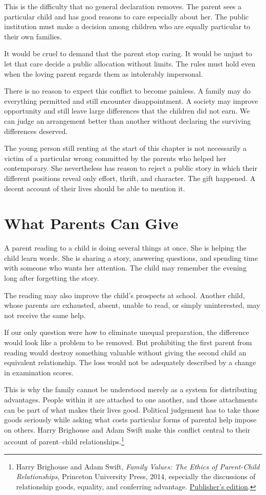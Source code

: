 \documentclass[12pt,a4paper]{book}
\begin{document}
This is the difficulty that no general declaration removes. The parent sees a particular child and has good reasons to care especially about her. The public institution must make a decision among children who are equally particular to their own families.

It would be cruel to demand that the parent stop caring. It would be unjust to let that care decide a public allocation without limits. The rules must hold even when the loving parent regards them as intolerably impersonal.

There is no reason to expect this conflict to become painless. A family may do everything permitted and still encounter disappointment. A society may improve opportunity and still leave large differences that the children did not earn. We can judge an arrangement better than another without declaring the surviving differences deserved.

The young person still renting at the start of this chapter is not necessarily a victim of a particular wrong committed by the parents who helped her contemporary. She nevertheless has reason to reject a public story in which their different positions reveal only effort, thrift, and character. The gift happened. A decent account of their lives should be able to mention it.

\chapter{What Parents Can Give}

A parent reading to a child is doing several things at once. She is helping the child learn words. She is sharing a story, answering questions, and spending time with someone who wants her attention. The child may remember the evening long after forgetting the story.

The reading may also improve the child's prospects at school. Another child, whose parents are exhausted, absent, unable to read, or simply uninterested, may not receive the same help.

If our only question were how to eliminate unequal preparation, the difference would look like a problem to be removed. But prohibiting the first parent from reading would destroy something valuable without giving the second child an equivalent relationship. The loss would not be adequately described by a change in examination scores.

This is why the family cannot be understood merely as a system for distributing advantages. People within it are attached to one another, and those attachments can be part of what makes their lives good. Political judgement has to take those goods seriously while asking what costs particular forms of parental help impose on others. Harry Brighouse and Adam Swift make this conflict central to their account of parent--child relationships.\footnote{Harry Brighouse and Adam Swift, \emph{Family Values: The Ethics of Parent-Child Relationships}, Princeton University Press, 2014, especially the discussions of relationship goods, equality, and conferring advantage. \href{https://academic.oup.com/princeton-scholarship-online/book/23923}{Publisher's edition}.}
\end{document}

